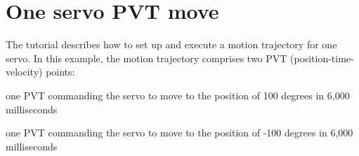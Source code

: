 \hypertarget{group__tutor__c__servomove1}{}\section{One servo P\+VT move}
\label{group__tutor__c__servomove1}
The tutorial describes how to set up and execute a motion trajectory for one servo. In this example, the motion trajectory comprises two P\+VT (position-\/time-\/velocity) points\+: 
\begin{DoxyItemize}
\item one P\+VT commanding the servo to move to the position of 100 degrees in 6,000 milliseconds 
\item one P\+VT commanding the servo to move to the position of -\/100 degrees in 6,000 milliseconds
\end{DoxyItemize}


